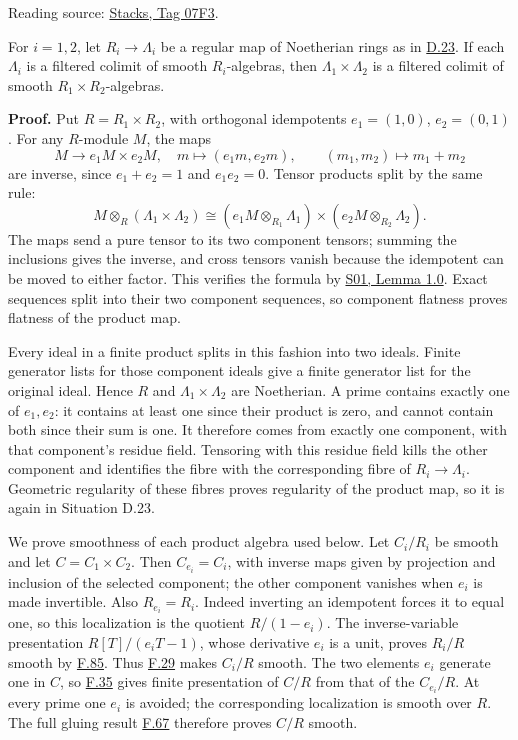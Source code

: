 \documentclass[11pt,a4paper,openany]{report}
\begin{document}
Reading source: \href{https://stacks.math.columbia.edu/tag/07F3}{Stacks, Tag 07F3}.

For \(i=1,2\), let \(R_i\to\Lambda_i\) be a regular map of Noetherian rings as in \hyperref[AG-RG-S05-smoothing-situation-global]{D.23}. If each \(\Lambda_i\) is a filtered colimit of smooth \(R_i\)-algebras, then \(\Lambda_1\times\Lambda_2\) is a filtered colimit of smooth \(R_1\times R_2\)-algebras.

\textbf{Proof.} Put \(R=R_1\times R_2\), with orthogonal idempotents \(e_1=(1,0)\), \(e_2=(0,1)\). For any \(R\)-module \(M\), the maps \[
M\longrightarrow e_1M\times e_2M,\quad m\longmapsto(e_1m,e_2m),
\qquad (m_1,m_2)\longmapsto m_1+m_2
\] are inverse, since \(e_1+e_2=1\) and \(e_1e_2=0\). Tensor products split by the same rule: \[
M\otimes_R(\Lambda_1\times\Lambda_2)
\cong(e_1M\otimes_{R_1}\Lambda_1)\times
      (e_2M\otimes_{R_2}\Lambda_2).
\] The maps send a pure tensor to its two component tensors; summing the inclusions gives the inverse, and cross tensors vanish because the idempotent can be moved to either factor. This verifies the formula by \href{https://github.com/KokunoYumeto/open-math-courses/blob/main/docs/courses/AG-RG/AG-RG-S01.md}{S01, Lemma 1.0}. Exact sequences split into their two component sequences, so component flatness proves flatness of the product map.

Every ideal in a finite product splits in this fashion into two ideals. Finite generator lists for those component ideals give a finite generator list for the original ideal. Hence \(R\) and \(\Lambda_1\times\Lambda_2\) are Noetherian. A prime contains exactly one of \(e_1,e_2\): it contains at least one since their product is zero, and cannot contain both since their sum is one. It therefore comes from exactly one component, with that component's residue field. Tensoring with this residue field kills the other component and identifies the fibre with the corresponding fibre of \(R_i\to\Lambda_i\). Geometric regularity of these fibres proves regularity of the product map, so it is again in Situation D.23.

We prove smoothness of each product algebra used below. Let \(C_i/R_i\) be smooth and let \(C=C_1\times C_2\). Then \(C_{e_i}=C_i\), with inverse maps given by projection and inclusion of the selected component; the other component vanishes when \(e_i\) is made invertible. Also \(R_{e_i}=R_i\). Indeed inverting an idempotent forces it to equal one, so this localization is the quotient \(R/(1-e_i)\). The inverse-variable presentation \(R[T]/(e_iT-1)\), whose derivative \(e_i\) is a unit, proves \(R_i/R\) smooth by \hyperref[AG-RG-S05-algebra-lemma-standard-smooth]{F.85}. Thus \hyperref[AG-RG-S05-algebra-lemma-compose-smooth]{F.29} makes \(C_i/R\) smooth. The two elements \(e_i\) generate one in \(C\), so \hyperref[AG-RG-S05-algebra-lemma-cover-upstairs]{F.35} gives finite presentation of \(C/R\) from that of the \(C_{e_i}/R\). At every prime one \(e_i\) is avoided; the corresponding localization is smooth over \(R\). The full gluing result \hyperref[AG-RG-S05-algebra-lemma-locally-smooth]{F.67} therefore proves \(C/R\) smooth.
\end{document}
